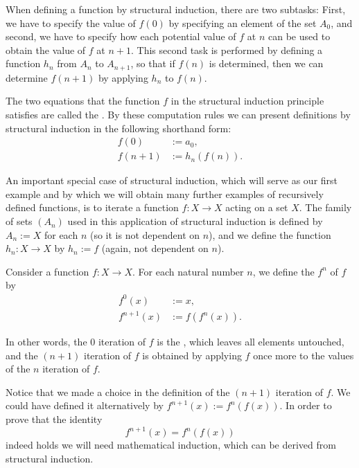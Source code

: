 \begin{remark}
When defining a function by structural induction, there are two subtasks: First, we have to specify the value of $f(0)$ by specifying an element of the set $A_0$, and second, we have to specify how each potential value of $f$ at $n$ can be used to obtain the value of $f$ at $n+1$. This second task is performed by defining a function $h_n$ from $A_n$ to $A_{n+1}$, so that if $f(n)$ is determined, then we can determine $f(n+1)$ by applying $h_n$ to $f(n)$.

The two equations that the function $f$ in the structural induction principle satisfies are called the . By these computation rules we can present definitions by structural induction in the following shorthand form:
\begin{align*}
  f(0) & := a_0, \\
  f(n+1) & := h_n(f(n)).
\end{align*}
\end{remark}

An important special case of structural induction, which will serve as our first example and by which we will obtain many further examples of recursively defined functions, is to iterate a function $f:X\to X$ acting on a set $X$. The family of sets $(A_n)$ used in this application of structural induction is defined by $A_n:= X$ for each $n$ (so it is not dependent on $n$), and we define the function $h_n:X\to X$ by $h_n:=f$ (again, not dependent on $n$).

\begin{definition}
  Consider a function $f:X\to X$. For each natural number $n$, we define the  $f^n$ of $f$ by
  \begin{align*}
    f^0(x) & := x, \\
    f^{n+1}(x) & := f(f^n(x)). 
  \end{align*}  
\end{definition}

In other words, the $0$\supth{} iteration of $f$ is the , which leaves all elements untouched, and the $(n+1)$\supst{} iteration of $f$ is obtained by applying $f$ once more to the values of the $n$\supth{} iteration of $f$.

\begin{remark}\label{remark:alternative-iteration}
  Notice that we made a choice in the definition of the $(n+1)$\supst{} iteration of $f$. We could have defined it alternatively by $f^{n+1}(x):=f^n(f(x))$. In order to prove that the identity
  \begin{equation*}
    f^{n+1}(x)=f^n(f(x))
  \end{equation*}
  indeed holds we will need mathematical induction, which can be derived from structural induction.  
\end{remark}

